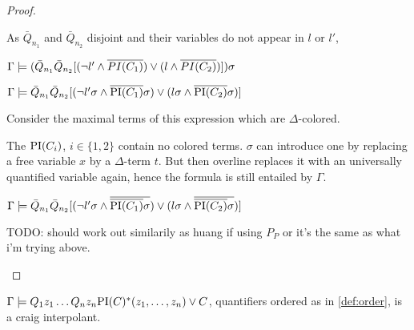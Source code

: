 \begin{proof}
\begin{enumerate}
						As $\bar Q_{n_1}$ and $\bar Q_{n_2}$ disjoint and their variables do not appear in $l$ or $l'$,

						$\Gamma \models (\bar Q_{n_1} \bar Q_{n_2} [ (\lnot l' \land  \overline{PI(C_1)}) \lor (l \land \overline{PI(C_2)}) ] ) \sigma$

						$\Gamma \models \bar Q_{n_1} \bar Q_{n_2} [ (\lnot l'\sigma \land  \overline{\mathrm{PI}(C_1)}\sigma) \lor (l\sigma \land \overline{\mathrm{PI}(C_2)}\sigma) ] $

						Consider the maximal terms of this expression which are $\Delta$-colored.

						The $\mathrm{PI}(C_i)$, $i \in \{1,2\}$ contain no colored terms. $\sigma$ can introduce one by replacing a free variable $x$ by a $\Delta$-term $t$. But then overline replaces it with an universally quantified variable again, hence the formula is still entailed by $\Gamma$.

						$\Gamma \models \bar Q_{n_1} \bar Q_{n_2} [ (\lnot l'\sigma \land  \overline{\overline{\mathrm{PI}(C_1)}\sigma}) \lor (l\sigma \land \overline{\overline{\mathrm{PI}(C_2)}\sigma}) ] $



						TODO: should work out similarily as huang if using $P_P$ or it's the same as what i'm trying above.

				\end{enumerate}
				\end{proof}



\begin{prop}
	$\Gamma \models Q_1 z_1 \ldots Q_n z_n \mathrm{PI}(C)^*(z_1, \ldots, z_n)  \lor C$, quantifiers ordered as in \ref{def:order}, is a craig interpolant.
\end{prop}

